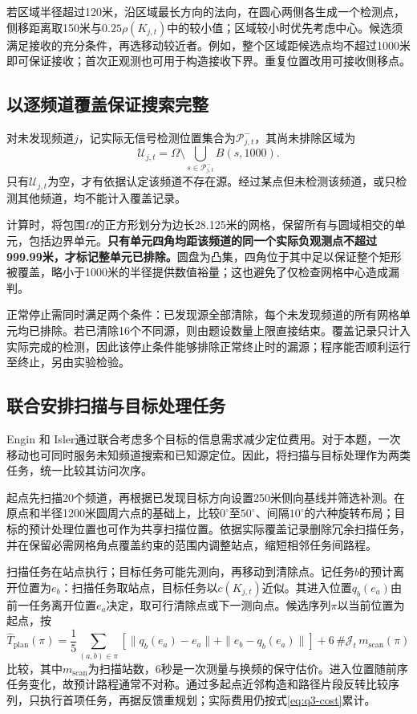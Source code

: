 若区域半径超过120米，沿区域最长方向的法向，在圆心两侧各生成一个检测点，侧移距离取150米与$0.25\rho(K_{j,t})$中的较小值；区域较小时优先考虑中心。候选须满足接收的充分条件，再选移动较近者。例如，整个区域距候选点均不超过1000米即可保证接收；首次正观测也可用于构造接收下界。重复位置改用可接收侧移点。

\subsection{以逐频道覆盖保证搜索完整}

对未发现频道$j$，记实际无信号检测位置集合为$\mathcal P^-_{j,t}$，其尚未排除区域为
\begin{equation}
\mathcal U_{j,t}=\Omega\setminus
 \bigcup_{s\in\mathcal P^-_{j,t}}B(s,1000).
\label{eq:q3-uncovered}
\end{equation}
只有$\mathcal U_{j,t}$为空，才有依据认定该频道不存在源。经过某点但未检测该频道，或只检测其他频道，均不能计入覆盖记录。

计算时，将包围$\Omega$的正方形划分为边长28.125米的网格，保留所有与圆域相交的单元，包括边界单元。\textbf{只有单元四角均距该频道的同一个实际负观测点不超过999.99米，才标记整单元已排除。}圆盘为凸集，四角位于其中足以保证整个矩形被覆盖，略小于1000米的半径提供数值裕量；这也避免了仅检查网格中心造成漏判。

正常停止需同时满足两个条件：已发现源全部清除，每个未发现频道的所有网格单元均已排除。若已清除16个不同源，则由题设数量上限直接结束。覆盖记录只计入实际完成的检测，因此该停止条件能够排除正常终止时的漏源；程序能否顺利运行至终止，另由实验检验。

\subsection{联合安排扫描与目标处理任务}

Engin 和 Isler\cite{Engin2020}通过联合考虑多个目标的信息需求减少定位费用。对于本题，一次移动也可同时服务未知频道搜索和已知源定位。因此，将扫描与目标处理作为两类任务，统一比较其访问次序。

起点先扫描20个频道，再根据已发现目标方向设置250米侧向基线并筛选补测。在原点和半径1200米圆周六点的基础上，比较$0^\circ$至$50^\circ$、间隔$10^\circ$的六种旋转布局；目标的预计处理位置也可作为共享扫描位置。依据实际覆盖记录删除冗余扫描任务，并在保留必需网格角点覆盖约束的范围内调整站点，缩短相邻任务间路程。

扫描任务在站点执行；目标任务可能先测向，再移动到清除点。记任务$b$的预计离开位置为$e_b$：扫描任务取站点，目标任务以$c(K_{j,t})$近似。其进入位置$q_b(e_a)$由前一任务离开位置$e_a$决定，取可行清除点或下一测向点。候选序列$\pi$以当前位置为起点，按
\begin{equation}
\widehat T_{\mathrm{plan}}(\pi)=
\frac15\sum_{(a,b)\in\pi}
\left[\|q_b(e_a)-e_a\|+\|e_b-q_b(e_a)\|\right]
+6\,\#\mathcal J_t\,m_{\mathrm{scan}}(\pi)
\label{eq:q3-route-score}
\end{equation}
比较，其中$m_{\mathrm{scan}}$为扫描站数，6秒是一次测量与换频的保守估价。进入位置随前序任务变化，故预计路程通常不对称。通过多起点近邻构造和路径片段反转比较序列，只执行首项任务，再据反馈重规划；实际费用仍按式\eqref{eq:q3-cost}累计。

